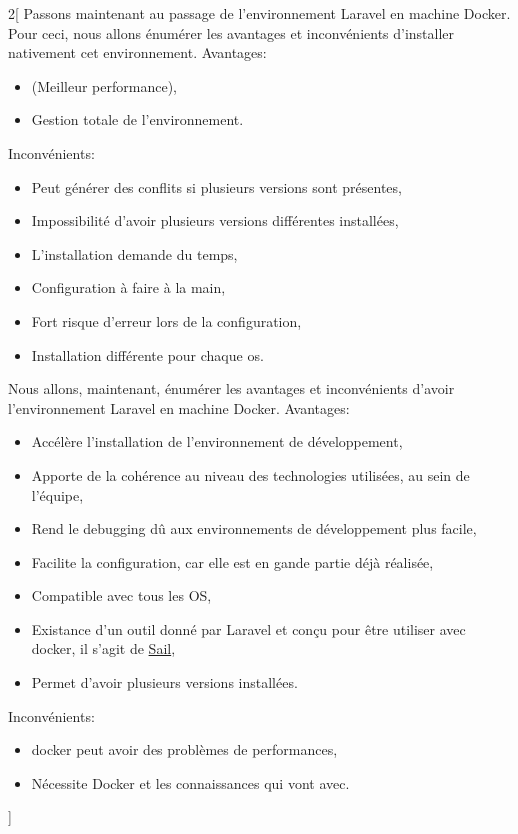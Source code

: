 \documentclass[
    iai, %
    il, %
]{heig-tb}
\begin{document}
\begin{multicols}{2}[
        Passons maintenant au passage de l'environnement Laravel en machine Docker.
        Pour ceci, nous allons énumérer les avantages et inconvénients d'installer nativement cet environnement.
        Avantages:
        \begin{itemize}
            \item (Meilleur performance),
            \item Gestion totale de l'environnement.
        \end{itemize}

        Inconvénients:
        \begin{itemize}
            \item Peut générer des conflits si plusieurs versions sont présentes,
            \item Impossibilité d'avoir plusieurs versions différentes installées,
            \item L'installation demande du temps,
            \item Configuration à faire à la main,
            \item Fort risque d'erreur lors de la configuration,
            \item Installation différente pour chaque \Gls{os}.
        \end{itemize}

        Nous allons, maintenant, énumérer les avantages et inconvénients d'avoir l'environnement Laravel en machine Docker.
        Avantages:
        \begin{itemize}
            \item Accélère l'installation de l'environnement de développement, \cite{labrecque}
            \item Apporte de la cohérence au niveau des technologies utilisées, au sein de l'équipe, \cite{labrecque, data-flair-use-cases}
            \item Rend le debugging dû aux environnements de développement plus facile, \cite{labrecque,koukia}
            \item Facilite la configuration, car elle est en gande partie déjà réalisée, \cite{data-flair-pros-cons}
            \item Compatible avec tous les OS,
            \item Existance d'un outil donné par Laravel et conçu pour être utiliser avec \Gls{docker}, il s'agit de \href{https://laravel.com/docs/9.x/sail}{Sail},
            \item Permet d'avoir plusieurs versions installées.
        \end{itemize}

        Inconvénients:
        \begin{itemize}
            \item \Gls{docker} peut avoir des problèmes de performances, \cite{labrecque}
            \item Nécessite Docker et les connaissances qui vont avec. \cite{labrecque}
        \end{itemize}
    ]
    \blindtext\blindtext
\end{multicols}
\end{document}
